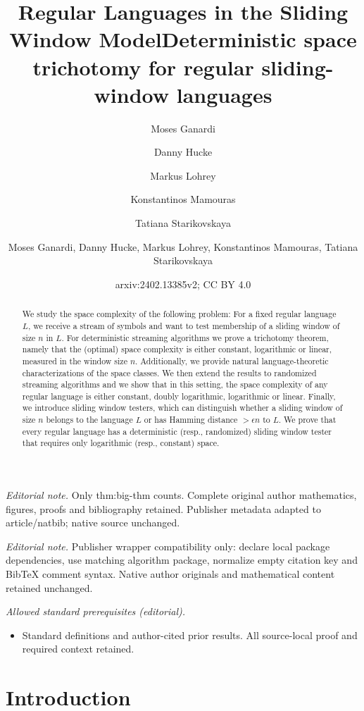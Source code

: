 \documentclass{article}\usepackage[a4paper,margin=20mm]{geometry}
\title{Regular Languages in the Sliding Window Model}
\author{Moses Ganardi \and Danny Hucke \and Markus Lohrey \and Konstantinos Mamouras \and Tatiana Starikovskaya}\date{}
\title{Deterministic space trichotomy for regular sliding-window languages}
\author{Moses Ganardi, Danny Hucke, Markus Lohrey, Konstantinos Mamouras, Tatiana Starikovskaya}
\date{arxiv:2402.13385v2; CC BY 4.0}
\begin{document}
\maketitle
\noindent\textit{Editorial note.} Only thm:big-thm counts. Complete original author mathematics, figures, proofs and bibliography retained. Publisher metadata adapted to article/natbib; native source unchanged.\par\medskip
\noindent\textit{Editorial note.} Publisher wrapper compatibility only: declare local package dependencies, use matching algorithm package, normalize empty citation key and BibTeX comment syntax. Native author originals and mathematical content retained unchanged.\par\medskip
\noindent\textit{Allowed standard prerequisites (editorial).}\begin{itemize}
\item Standard definitions and author-cited prior results. All source-local proof and required context retained.
\end{itemize}\medskip
\maketitle

\begin{abstract}
We study the space complexity of the following problem:
For a fixed regular language $L$, we receive a stream of symbols and want to test membership of a sliding window of size $n$ in $L$.
For deterministic streaming algorithms we prove a trichotomy theorem,
namely that the (optimal) space complexity is either constant, logarithmic or linear,
measured in the window size $n$.
Additionally, we provide natural language-theoretic characterizations
of the space classes.
We then extend the results to randomized streaming algorithms and we show that in this setting, the space complexity of any regular language is either constant, doubly logarithmic, logarithmic or linear.
Finally, we introduce sliding window testers, which can distinguish
whether a sliding window of size $n$ belongs to the language $L$ or
has Hamming distance $> \epsilon n$ to $L$.
We prove that every regular language has a deterministic (resp., randomized) sliding window tester
that requires only logarithmic (resp., constant) space.
\end{abstract}






\section{Introduction}
\end{document}
